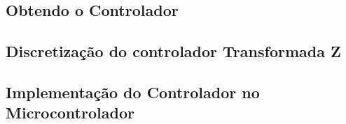 \subsection{Obtendo o Controlador}


\subsection{Discretização do controlador Transformada Z}

\subsection{Implementação do Controlador no Microcontrolador}
